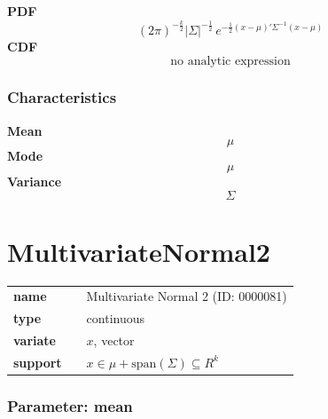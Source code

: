 \smallskip \noindent \hspace{.2cm} \textbf{PDF} 
\begin{equation*}(2\pi)^{-\frac{k}{2}}|\Sigma|^{-\frac{1}{2}}\, e^{ -\frac{1}{2}(x-\mu)'\Sigma^{-1}(x-\mu) }\end{equation*}
\smallskip \noindent \hspace{.2cm} \textbf{CDF} 
\begin{equation*}\text{no analytic expression}\end{equation*}
\smallskip
\subsubsection*{Characteristics}
\smallskip \noindent \hspace{.2cm} \textbf{Mean} 
\begin{equation*}\mu\end{equation*}
\smallskip \noindent \hspace{.2cm} \textbf{Mode} 
\begin{equation*}\mu\end{equation*}
\smallskip \noindent \hspace{.2cm} \textbf{Variance} 
\begin{equation*}\Sigma\end{equation*}
\smallskip
\section*{MultivariateNormal2} 

  \bigskip 

\begin{tabular}{p{2cm}cl}
\textbf{name} & & Multivariate Normal 2 (ID: 0000081)\\ 
 
\textbf{type} & & continuous \\ 

\textbf{variate} & & $x$, vector \\ 

\textbf{support} & & $x \in \mu + \text{span}(\Sigma) \subseteq  R^k$
\end{tabular}


\subsubsection*{Parameter: mean}

